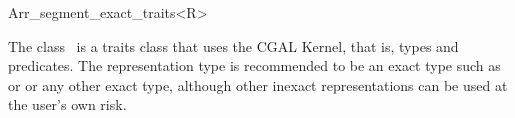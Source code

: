 
\ccRefPageBegin


\begin{ccRefClass}{Arr_segment_exact_traits<R>}

\ccDefinition
   The class \ccRefName\ is
   a traits class that uses the CGAL Kernel, that is, types and predicates.
   The representation type  is recommended to be an
   exact type such as  or
    or any other
   exact type, although other inexact representations can be used at
   the user's own risk.


\ccIsModel
     


\end{ccRefClass} %




\ccRefPageEnd
